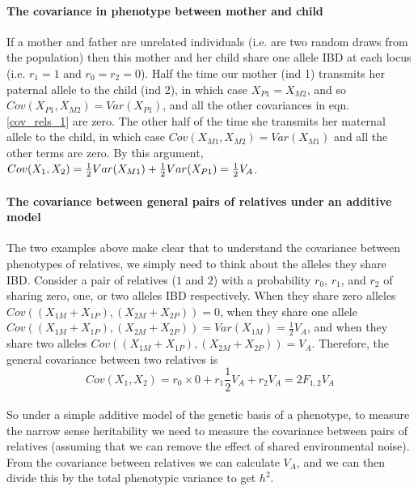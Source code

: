 
\paragraph{The covariance in phenotype between mother and child}


If a mother and father are unrelated individuals (i.e. are two
random draws from the population) then this mother and her child share
one allele IBD at each locus (i.e. $r_1=1$ and $r_0=r_2=0$). Half the
time our mother (ind 1) transmits her paternal allele to the child (ind 2), in which
case $X_{P1}=X_{M2}$, and so $Cov(X_{P1},X_{M2})=Var(X_{P1})$, and all
the other covariances in eqn. \ref{cov_rels_1} are zero. The other half of the time she transmits her maternal allele to the child, in which case
$Cov(X_{M1},X_{M2})=Var(X_{M1})$ and all the other terms are zero. By this
argument, $Cov(X_1,X_2) = \tfrac{1}{2} Var(X_{M1}) + \tfrac{1}{2} Var(X_{P1}) = \tfrac{1}{2}
V_A$. \\



\paragraph{The covariance between general pairs of relatives under an
additive model}


The two examples above make clear that to understand the covariance between
phenotypes of relatives, we simply need to think about the alleles they
share IBD. Consider a pair of relatives ($1$ and $2$) with a probability $r_0$,
$r_1$, and $r_2$ of sharing zero, one, or two alleles IBD
respectively. When they share zero alleles
$Cov((X_{1M}+X_{1P}),(X_{2M}+X_{2P}))=0$, when they share one allele
$Cov((X_{1M}+X_{1P}),(X_{2M}+X_{2P}))=
Var(X_{1M})=\frac{1}{2}V_A$, and when they share two alleles $Cov((X_{1M}+X_{1P}),(X_{2M}+X_{2P}))=
V_A$. Therefore, the general covariance between two
relatives is
\begin{equation}
Cov(X_1,X_2) = r_0 \times 0 + r_1 \frac{1}{2}V_A + r_2  V_A =
2 F_{1,2} V_A  \label{additive_covar_general_rellys}
\end{equation}\\
So under a simple additive model of the genetic basis of a phenotype,
to measure the narrow sense heritability we need to measure the
covariance between pairs of relatives (assuming that we can remove the effect of
shared environmental noise). From the covariance between relatives we
can calculate $V_A$, and we can then divide this by the total phenotypic
variance to get $h^2$. \\

